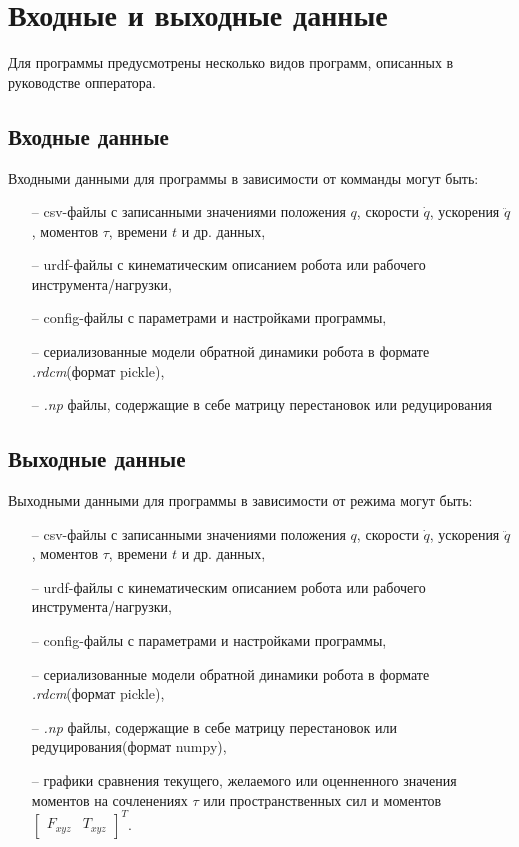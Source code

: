 \newpage
\section{Входные и выходные данные}
Для программы предусмотрены несколько видов программ, описанных в руководстве опператора.

\subsection{Входные данные}
Входными данными для программы в зависимости от комманды могут быть:
\begin{enumerate}
    \item [--] csv-файлы с записанными значениями положения $q$, скорости $\dot{q}$, ускорения $\ddot{q}$, моментов $\tau$, времени $t$ и др. данных,
	\item [--] urdf-файлы с кинематическим описанием робота или рабочего инструмента/нагрузки,
	\item [--] config-файлы с параметрами и настройками программы,
    \item [--] сериализованные модели обратной динамики робота в формате \textit{.rdcm}(формат pickle),
    \item [--] \textit{.np} файлы, содержащие в себе матрицу перестановок или редуцирования
\end{enumerate}

\subsection{Выходные данные}
Выходными данными для программы в зависимости от режима могут быть:
\begin{enumerate}
    \item [--] csv-файлы с записанными значениями положения $q$, скорости $\dot{q}$, ускорения $\ddot{q}$, моментов $\tau$, времени $t$ и др. данных,
	\item [--] urdf-файлы с кинематическим описанием робота или рабочего инструмента/нагрузки,
	\item [--] config-файлы с параметрами и настройками программы,
    \item [--] сериализованные модели обратной динамики робота в формате \textit{.rdcm}(формат pickle),
    \item [--] \textit{.np} файлы, содержащие в себе матрицу перестановок или редуцирования(формат numpy),
    \item [--] графики сравнения текущего, желаемого или оценненного значения моментов на сочленениях $\tau$ или пространственных сил и моментов $\begin{bmatrix} F_{xyz} & T_{xyz}\end{bmatrix}^T$.
\end{enumerate}